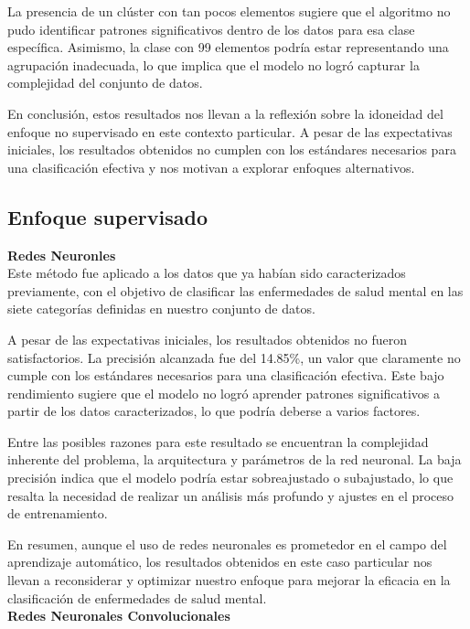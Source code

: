 \documentclass[
10pt, %
a4paper, %
oneside, %
headinclude,footinclude, %
BCOR5mm, %
]{scrartcl}
\begin{document}
La presencia de un clúster con tan pocos elementos sugiere que el algoritmo no pudo identificar patrones significativos dentro de los datos para esa clase específica. Asimismo, la clase con 99 elementos podría estar representando una agrupación inadecuada,
lo que implica que el modelo no logró capturar la complejidad del conjunto de datos.

En conclusión, estos resultados nos llevan a la reflexión sobre la idoneidad del enfoque no supervisado en este contexto particular. A pesar de las expectativas iniciales, los resultados obtenidos no cumplen con los estándares necesarios para 
una clasificación efectiva y nos motivan a explorar enfoques alternativos.

\subsection{Enfoque supervisado}

\textbf{Redes Neuronles}\\

Este método fue aplicado a los datos que ya habían sido caracterizados previamente, con el objetivo de clasificar las enfermedades de salud mental en las siete categorías definidas en nuestro conjunto de datos.

A pesar de las expectativas iniciales, los resultados obtenidos no fueron satisfactorios. La precisión alcanzada fue del 14.85\%, un valor que claramente no cumple con los estándares necesarios para una clasificación efectiva. 
Este bajo rendimiento sugiere que el modelo no logró aprender patrones significativos a partir de los datos caracterizados, lo que podría deberse a varios factores.

Entre las posibles razones para este resultado se encuentran la complejidad inherente del problema, la arquitectura y parámetros de la red neuronal. La baja precisión indica que el modelo podría estar sobreajustado o subajustado, 
lo que resalta la necesidad de realizar un análisis más profundo y ajustes en el proceso de entrenamiento.

En resumen, aunque el uso de redes neuronales es prometedor en el campo del aprendizaje automático, los resultados obtenidos en este caso particular nos llevan a reconsiderar y optimizar nuestro enfoque para mejorar la eficacia en la clasificación de enfermedades de salud mental.\\


\textbf{Redes Neuronales Convolucionales}\\
\end{document}
